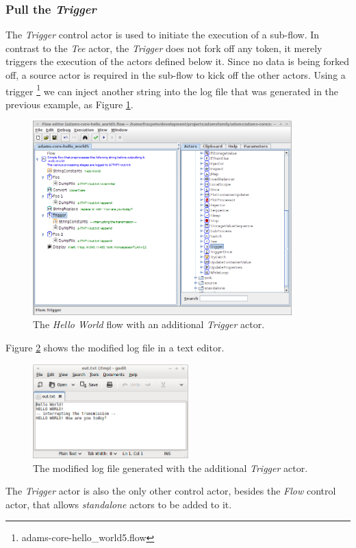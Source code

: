 \subsubsection{Pull the \textit{Trigger}}
The \textit{Trigger} control actor is used to initiate the execution of a
sub-flow. In contrast to the \textit{Tee} actor, the \textit{Trigger} does not
fork off any token, it merely triggers the execution of the actors defined below
it. Since no data is being forked off, a source actor is required in the
sub-flow to kick off the other actors. Using a trigger
\footnote{adams-core-hello\_world5.flow} we can inject another string into the
log file that was generated in the previous example, as Figure \ref{floweditor-helloworld-trigger_flow}.
\begin{figure}[htb]
  \centering
  \includegraphics[width=10.0cm]{images/floweditor-helloworld-trigger_flow.png}
  \caption{The \textit{Hello World} flow with an additional \textit{Trigger}
  actor.}
  \label{floweditor-helloworld-trigger_flow}
\end{figure}
Figure \ref{floweditor-helloworld-trigger_logfile} shows the modified
log file in a text editor.
\begin{figure}[htb]
  \centering
  \includegraphics[width=6.0cm]{images/floweditor-helloworld-trigger_logfile.png}
  \caption{The modified log file generated with the additional \textit{Trigger}
  actor.}
  \label{floweditor-helloworld-trigger_logfile}
\end{figure}
The \textit{Trigger} actor is also the only other control actor, besides the
\textit{Flow} control actor, that allows \textit{standalone} actors to be added
to it.

